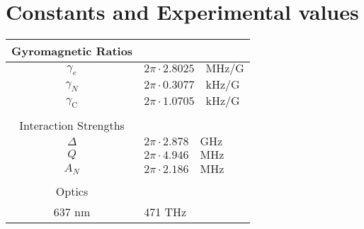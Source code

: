 
\chapter{Constants and Experimental values}


\begin{table}[htbp]
    \begin{tabular}{cl}

    Gyromagnetic Ratios  \\ \hline
    $\gamma_e $ & $2\pi \cdot 2.8025\quad \mathrm{MHz/G} $ \\
    $\gamma_{N}$ & $2\pi \cdot 0.3077\quad \mathrm{kHz/G}$   \\
    $\gamma_\mathrm{C}$ & $2\pi \cdot 1.0705\quad \mathrm{kHz/G}$   \\ \hline
    \\
    Interaction Strengths  \\ \hline
    $\Delta $ & $2\pi \cdot 2.878\quad \mathrm{GHz} $\\
    $Q $ & $2\pi \cdot 4.946\quad \mathrm{MHz} $\\
    $A_N $ & $2\pi \cdot 2.186\quad \mathrm{MHz} $\\ \hline
    \\
    Optics\\ \hline
    637 nm & 471 THz \\ \hline
    \end{tabular}
    \label{tbl:constants and experimental values}
\end{table}
